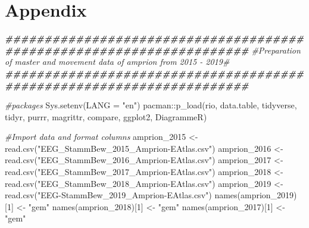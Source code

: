\documentclass[a4paper,11pt]{article}
\newenvironment{Shaded}{\begin{snugshade}}{\end{snugshade}}
\newcommand{\AttributeTok}[1]{\textcolor[rgb]{0.77,0.63,0.00}{#1}}
\newcommand{\CommentTok}[1]{\textcolor[rgb]{0.56,0.35,0.01}{\textit{#1}}}
\newcommand{\DecValTok}[1]{\textcolor[rgb]{0.00,0.00,0.81}{#1}}
\newcommand{\DocumentationTok}[1]{\textcolor[rgb]{0.56,0.35,0.01}{\textbf{\textit{#1}}}}
\newcommand{\FunctionTok}[1]{\textcolor[rgb]{0.00,0.00,0.00}{#1}}
\newcommand{\NormalTok}[1]{#1}
\newcommand{\OtherTok}[1]{\textcolor[rgb]{0.56,0.35,0.01}{#1}}
\newcommand{\SpecialCharTok}[1]{\textcolor[rgb]{0.00,0.00,0.00}{#1}}
\newcommand{\StringTok}[1]{\textcolor[rgb]{0.31,0.60,0.02}{#1}}
\begin{document}
\newpage

\appendix

\hypertarget{appendix}{%
\section{Appendix}\label{appendix}}
\begin{Shaded}
\begin{Highlighting}[]
\DocumentationTok{\#\#\#\#\#\#\#\#\#\#\#\#\#\#\#\#\#\#\#\#\#\#\#\#\#\#\#\#\#\#\#\#\#\#\#\#\#\#\#\#\#\#\#\#\#\#\#\#\#\#\#\#\#\#\#\#\#\#\#\#\#\#\#\#\#\#\#\#\#}
\CommentTok{\#Preparation of master and movement data of amprion from 2015 {-} 2019\#}
\DocumentationTok{\#\#\#\#\#\#\#\#\#\#\#\#\#\#\#\#\#\#\#\#\#\#\#\#\#\#\#\#\#\#\#\#\#\#\#\#\#\#\#\#\#\#\#\#\#\#\#\#\#\#\#\#\#\#\#\#\#\#\#\#\#\#\#\#\#\#\#\#\#}

\CommentTok{\#packages}
\FunctionTok{Sys.setenv}\NormalTok{(}\AttributeTok{LANG =} \StringTok{"en"}\NormalTok{)}
\NormalTok{pacman}\SpecialCharTok{::}\FunctionTok{p\_load}\NormalTok{(rio, data.table, tidyverse, tidyr, purrr, magrittr, compare, }
\NormalTok{               ggplot2, DiagrammeR)}


\CommentTok{\#Import data and format columns}
\NormalTok{amprion\_2015 }\OtherTok{\textless{}{-}} \FunctionTok{read.csv}\NormalTok{(}\StringTok{"EEG\_StammBew\_2015\_Amprion{-}EAtlas.csv"}\NormalTok{)}
\NormalTok{amprion\_2016 }\OtherTok{\textless{}{-}} \FunctionTok{read.csv}\NormalTok{(}\StringTok{"EEG\_StammBew\_2016\_Amprion{-}EAtlas.csv"}\NormalTok{)}
\NormalTok{amprion\_2017 }\OtherTok{\textless{}{-}} \FunctionTok{read.csv}\NormalTok{(}\StringTok{"EEG\_StammBew\_2017\_Amprion{-}EAtlas.csv"}\NormalTok{)}
\NormalTok{amprion\_2018 }\OtherTok{\textless{}{-}} \FunctionTok{read.csv}\NormalTok{(}\StringTok{"EEG\_StammBew\_2018\_Amprion{-}EAtlas.csv"}\NormalTok{)}
\NormalTok{amprion\_2019 }\OtherTok{\textless{}{-}} \FunctionTok{read.csv}\NormalTok{(}\StringTok{"EEG{-}StammBew\_2019\_Amprion{-}EAtlas.csv"}\NormalTok{)}
\FunctionTok{names}\NormalTok{(amprion\_2019)[}\DecValTok{1}\NormalTok{] }\OtherTok{\textless{}{-}} \StringTok{"gem"}
\FunctionTok{names}\NormalTok{(amprion\_2018)[}\DecValTok{1}\NormalTok{] }\OtherTok{\textless{}{-}} \StringTok{"gem"}
\FunctionTok{names}\NormalTok{(amprion\_2017)[}\DecValTok{1}\NormalTok{] }\OtherTok{\textless{}{-}} \StringTok{"gem"}


\end{Highlighting}
\end{Shaded}
\end{document}
